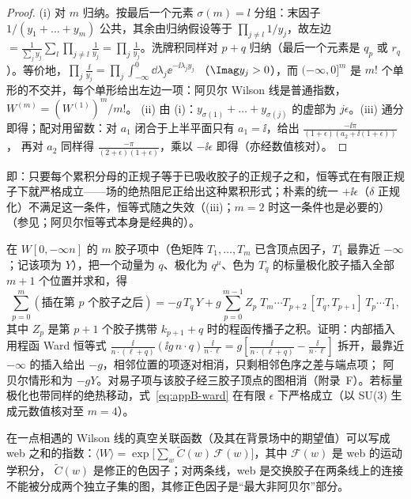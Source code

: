 \begin{proof}
(i) 对 $m$ 归纳。按最后一个元素 $\sigma(m)=l$ 分组：末因子 $1/(y_1+\dots+y_m)$ 公共，其余由归纳假设等于 $\prod_{j\ne l}1/y_j$，故左边
$=\frac{1}{\sum_jy_j}\sum_l\prod_{j\ne l}\frac1{y_j}=\prod_j\frac1{y_j}$。洗牌积同样对 $p+q$ 归纳（最后一个元素是 $q_p$ 或 $r_q$）。等价地，$\prod_j\frac{\ii}{y_j}=\prod_j\int_{-\infty}^0\dd\lambda_j\ee^{-\ii\lambda_jy_j}$
（$\Imag y_j>0$），而 $(-\infty,0]^m$ 是 $m!$ 个单形的不交并，每个单形给出左边一项：阿贝尔 Wilson 线是普通指数，$W^{(m)}=(W^{(1)})^m/m!$。
(ii) 由 (i)：$y_{\sigma(1)}+\dots+y_{\sigma(j)}$ 的虚部为 $j\epsilon$。(iii) 通分即得；配对用留数：对 $a_1$ 闭合于上半平面只有 $a_1=\ii$，给出 $\frac{-\ii\pi}{(1+\epsilon)(a_2+\ii(1+\epsilon))}$，
再对 $a_2$ 同样得 $\frac{-\pi}{(2+\epsilon)(1+\epsilon)}$，乘以 $-\ii\epsilon$ 即得（亦经数值核对）。%
\end{proof}

即：只要每个累积分母的正规子等于已吸收胶子的正规子之和，恒等式在有限正规子下就严格成立——场的绝热阻尼正给出这种累积形式；朴素的统一 $+\ii\epsilon$（$\delta$ 正规化）不满足这一条件，恒等式随之失效（(iii)；$m=2$ 时这一条件也是必要的）
（参见\cite[式~(5)--(6)]{Echevarria:2015byo}；阿贝尔恒等式本身是经典的）。

\begin{remark}\label{rem:appB-ward}
在 $W[0,-\infty n]$ 的 $m$ 胶子项中（色矩阵 $T_1,\dots,T_m$ 已含顶点因子，$T_1$ 最靠近 $-\infty$；记该项为 $Y$），把一个动量为 $q$、极化为 $q^\mu$、色为 $T_q$ 的标量极化胶子插入全部 $m+1$ 个位置并求和，得
\begin{equation}\label{eq:appB-ward}
\sum_{p=0}^{m}(\text{插在第 }p\text{ 个胶子之后})=-g\,T_q\,Y+g\sum_{p=0}^{m-1}Z_p\;T_m\cdots T_{p+2}\,[T_q,T_{p+1}]\,T_p\cdots T_1 ,
\end{equation}
其中 $Z_p$ 是第 $p+1$ 个胶子携带 $k_{p+1}+q$ 时的程函传播子之积。证明：内部插入用程函 Ward 恒等式
$\frac{\ii}{n\cdot(\ell+q)}(\ii g\,n\cdot q)\frac{\ii}{n\cdot\ell}=g[\frac{\ii}{n\cdot(\ell+q)}-\frac{\ii}{n\cdot\ell}]$ 拆开，最靠近 $-\infty$ 的插入给出 $-g$，相邻位置的项逐对相消，只剩相邻色序之差与端点项；
阿贝尔情形和为 $-gY$。对易子项与该胶子经三胶子顶点的图相消（附录~F）。若标量极化也带同样的绝热移动，式~\eqref{eq:appB-ward} 在有限 $\epsilon$ 下严格成立（以 SU(3) 生成元数值核对至 $m=4$）。%
\end{remark}

\begin{proposition}\label{prop:appB-webs}
在一点相遇的 Wilson 线的真空关联函数（及其在背景场中的期望值）可以写成 web 之和的指数：$\langle W\rangle=\exp\big[\sum_w\tilde C(w)\,\mathcal F(w)\big]$，其中 $\mathcal F(w)$ 是 web 的运动学积分，
$\tilde C(w)$ 是修正的色因子；对两条线，web 是交换胶子在两条线上的连接不能被分成两个独立子集的图，其修正色因子是“最大非阿贝尔”部分\cite{Gatheral1983,FrenkelTaylor1984}。
\end{proposition}

